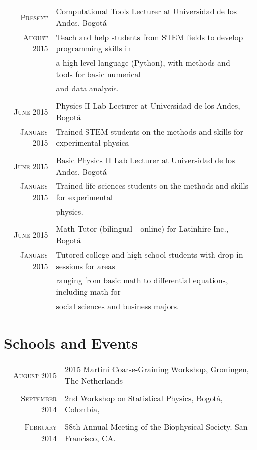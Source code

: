 \documentclass[a4paper,10pt]{article} %
\begin{document}
\begin{longtable}{rl}

\textsc{Present} & Computational Tools Lecturer at Universidad de los Andes, Bogot\'a  \\ 
\textsc{August 2015} & Teach and help students from STEM fields to develop programming skills in \\ & a high-level language (Python), with methods and tools for basic numerical  \\ & and data analysis. \\
\\

\textsc{June 2015} & Physics II Lab Lecturer at Universidad de los Andes, Bogot\'a  \\ 
\textsc{January 2015} & Trained STEM students on the methods and skills for experimental physics.\\
\\

\textsc{June 2015} & Basic Physics II Lab Lecturer at Universidad de los Andes, Bogot\'a \\ 
\textsc{January 2015} & Trained life sciences students on the methods and skills for experimental  \\ & physics.\\
\\

\textsc{June 2015} & Math Tutor (bilingual - online) for Latinhire Inc., Bogot\'a\\ 
\textsc{January 2015} & Tutored college and high school students with drop-in sessions for areas \\ & ranging from basic math to differential equations, including math for \\ & social sciences and business majors. 

\end{longtable}


\color{OrangeRed}
\section{Schools and Events}
\color{black}

\begin{tabular}{rl}

\textsc{August 2015} & 2015 Martini Coarse-Graining Workshop, Groningen, The Netherlands \\
\\
\textsc{September 2014} &  2nd Workshop on Statistical Physics, Bogotá, Colombia, \\
\\
\textsc{February 2014} &  58th Annual Meeting of the Biophysical Society. San Francisco, CA.

\end{tabular}
\end{document}
